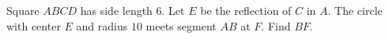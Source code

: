Square $ABCD$ has side length $6$. Let $E$ be the reflection of $C$ in $A$. The circle with center $E$ and radius $10$ meets segment $AB$ at $F$. Find $BF$.
